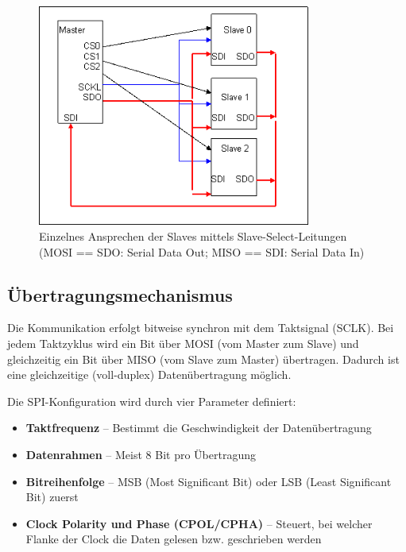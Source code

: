 \begin{figure}[H] %
	\centering
	\includegraphics[width=0.8\textwidth]{images/spi3.png}
	\caption{Einzelnes Ansprechen der Slaves mittels Slave-Select-Leitungen (MOSI == SDO: Serial Data Out; MISO == SDI: Serial Data In) \autocite{mct_spi_2019}}
	\label{fig:spi3}
\end{figure}

\subsection*{Übertragungsmechanismus}

Die Kommunikation erfolgt bitweise synchron mit dem Taktsignal (SCLK). Bei jedem Taktzyklus wird ein Bit über MOSI (vom Master zum Slave) und gleichzeitig ein Bit über MISO (vom Slave zum Master) übertragen. Dadurch ist eine gleichzeitige (voll-duplex) Datenübertragung möglich.

Die SPI-Konfiguration wird durch vier Parameter definiert:
\begin{itemize}
	\item \textbf{Taktfrequenz} – Bestimmt die Geschwindigkeit der Datenübertragung
	\item \textbf{Datenrahmen} – Meist 8 Bit pro Übertragung
	\item \textbf{Bitreihenfolge} – MSB (Most Significant Bit) oder LSB (Least Significant Bit) zuerst
	\item \textbf{Clock Polarity und Phase (CPOL/CPHA)} – Steuert, bei welcher Flanke der Clock die Daten gelesen bzw. geschrieben werden
\end{itemize}
